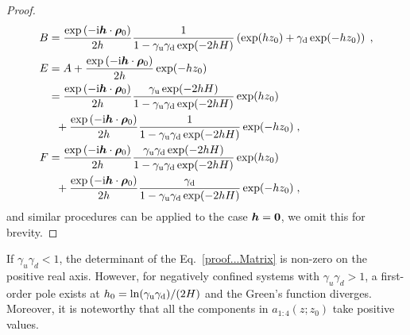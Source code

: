 \begin{proof}
\begin{align*}
B&=\frac{ \exp{(-\mathrm{i} \boldsymbol{h} \cdot \boldsymbol{\rho}_0)} }{2h }\frac{1}{1-\gamma_{\mathrm{u}}\gamma_{\mathrm{d}}\exp(-2hH)} \left(\exp(hz_0)+\gamma_{\mathrm{d}}\exp(-hz_0)\right)\;,\\
E&=A+\frac{\exp{(-\mathrm{i} \boldsymbol{h} \cdot \boldsymbol{\rho}_0)} }{2h }\exp(-hz_0)\\
&=\frac{\exp{(-\mathrm{i} \boldsymbol{h} \cdot \boldsymbol{\rho}_0)}}{2h }\frac{\gamma_{\mathrm{u}}\exp(-2hH)}{1-\gamma_{\mathrm{u}}\gamma_{\mathrm{d}}\exp(-2hH)} \exp(hz_0)\\&~~+\frac{\exp{(-\mathrm{i} \boldsymbol{h} \cdot \boldsymbol{\rho}_0)}}{2h }\frac{1}{1-\gamma_{\mathrm{u}}\gamma_{\mathrm{d}}\exp(-2hH)}\exp(-hz_0)\;,\\
F&=\frac{\exp{(-\mathrm{i} \boldsymbol{h} \cdot \boldsymbol{\rho}_0)}}{2h }\frac{\gamma_{\mathrm{u}}\gamma_{\mathrm{d}}\exp(-2hH)}{1-\gamma_{\mathrm{u}}\gamma_{\mathrm{d}}\exp(-2hH)} \exp(hz_0)\\&~~+\frac{\exp{(-\mathrm{i} \boldsymbol{h} \cdot \boldsymbol{\rho}_0)}}{2h }\frac{\gamma_{\mathrm{d}}}{1-\gamma_{\mathrm{u}}\gamma_{\mathrm{d}}\exp(-2hH)} \exp(-hz_0)\;,
\end{align*}
 and similar procedures can be applied to the case $\boldsymbol{h}=\bm{0}$, we omit this for brevity.
\end{proof}

\begin{rmk}\label{Remark...Nonzero+larger}
    If $\gamma_u \gamma_d < 1$, the determinant of the Eq.~\eqref{proof...Matrix} is non-zero on the positive real axis.
    However, for negatively confined systems with $\gamma_u \gamma_d > 1$, a first-order pole exists at $h_0 = \ln(\gamma_{\mathrm{u}} \gamma_{\mathrm{d}})/(2H)$ and the Green's function diverges.
    Moreover, it is noteworthy that all the components in $a_{1:4}(z;z_0)$ take positive values. 
\end{rmk}


